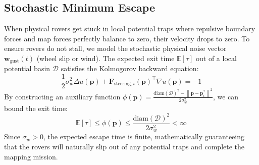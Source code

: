 \documentclass[letterpaper, 10pt, conference]{IEEEtran}
\newcommand{\norm}[1]{\left\lVert#1\right\rVert}
\begin{document}
\subsection{Stochastic Minimum Escape}
When physical rovers get stuck in local potential traps where repulsive boundary forces and map forces perfectly balance to zero, their velocity drops to zero. To ensure rovers do not stall, we model the stochastic physical noise vector $\mathbf{w}_{\text{gust}}(t)$ (wheel slip or wind). The expected exit time $\mathbb{E}[\tau]$ out of a local potential basin $\mathcal{D}$ satisfies the Kolmogorov backward equation:
\begin{equation}
    \frac{1}{2}\sigma_w^2 \Delta u(\mathbf{p}) + \mathbf{F}_{\text{steering}, i}(\mathbf{p})^\top \nabla u(\mathbf{p}) = -1
\end{equation}
By constructing an auxiliary function $\phi(\mathbf{p}) = \frac{\text{diam}(\mathcal{D})^2 - \norm{\mathbf{p} - \mathbf{p}^*_i}^2}{2\sigma_w^2}$, we can bound the exit time:
\begin{equation}
    \mathbb{E}[\tau] \leq \phi(\mathbf{p}) \leq \frac{\text{diam}(\mathcal{D})^2}{2\sigma_w^2} < \infty
\end{equation}
Since $\sigma_w > 0$, the expected escape time is finite, mathematically guaranteeing that the rovers will naturally slip out of any potential traps and complete the mapping mission.
\end{document}
